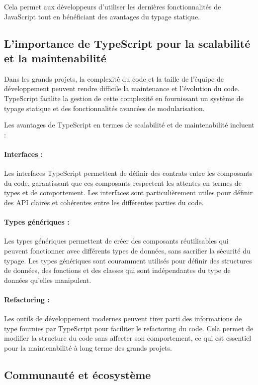 Cela permet aux développeurs d'utiliser les dernières fonctionnalités de JavaScript tout en bénéficiant des avantages du typage statique.

\subsection{L'importance de TypeScript pour la scalabilité et la maintenabilité}

Dans les grands projets, la complexité du code et la taille de l'équipe de développement peuvent rendre difficile la maintenance et l'évolution du code. TypeScript facilite la gestion de cette complexité en fournissant un système de typage statique et des fonctionnalités avancées de modularisation.

Les avantages de TypeScript en termes de scalabilité et de maintenabilité incluent :

\paragraph{Interfaces :} Les interfaces TypeScript permettent de définir des contrats entre les composants du code, garantissant que ces composants respectent les attentes en termes de types et de comportement. Les interfaces sont particulièrement utiles pour définir des API claires et cohérentes entre les différentes parties du code.
\paragraph{Types génériques :} Les types génériques permettent de créer des composants réutilisables qui peuvent fonctionner avec différents types de données, sans sacrifier la sécurité du typage. Les types génériques sont couramment utilisés pour définir des structures de données, des fonctions et des classes qui sont indépendantes du type de données qu'elles manipulent.
\paragraph{Refactoring :} Les outils de développement modernes peuvent tirer parti des informations de type fournies par TypeScript pour faciliter le refactoring du code. Cela permet de modifier la structure du code sans affecter son comportement, ce qui est essentiel pour la maintenabilité à long terme des grands projets.

\subsection{Communauté et écosystème}

